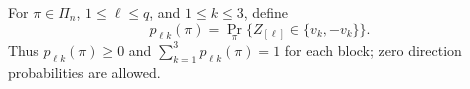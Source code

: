 For \(\pi\in\Pi_n\), \(1\le\ell\le q\), and \(1\le k\le3\), define
\[
p_{\ell k}(\pi)
=\Pr_\pi\{Z_{[\ell]}\in\{v_k,-v_k\}\}.
\]
Thus \(p_{\ell k}(\pi)\ge0\) and \(\sum_{k=1}^3p_{\ell k}(\pi)=1\) for each block; zero direction probabilities are allowed.